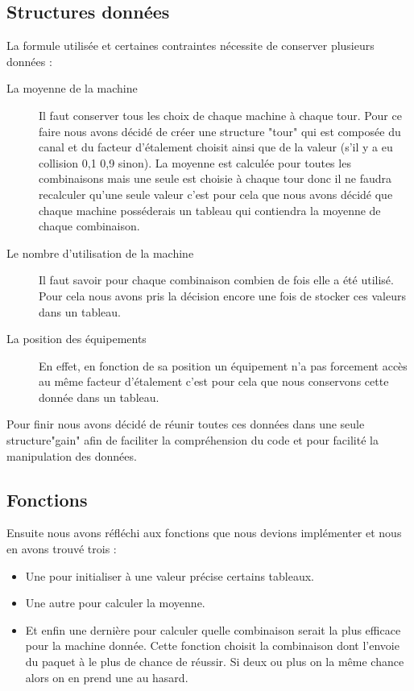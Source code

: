 \documentclass[12pt,a4paper]{article}
\begin{document}
\subsection{Structures données}
\label{sub.exp.struct}
La formule utilisée et certaines contraintes nécessite de conserver plusieurs données :
\begin{description}
    \item[La moyenne de la machine] Il faut conserver tous les 
    choix de chaque machine à chaque tour. Pour ce faire nous avons décidé
    de créer une structure "tour" qui est composée du canal et du facteur 
    d'étalement choisit ainsi que de la valeur (s'il y a eu collision 0,1
    0,9 sinon).
    La moyenne est calculée pour toutes les combinaisons mais une seule est 
    choisie à chaque tour donc il ne faudra recalculer qu'une seule valeur
    c'est pour cela que nous avons décidé que chaque machine posséderais 
    un tableau qui contiendra la moyenne de chaque combinaison.
    \item[Le nombre d'utilisation de la machine] Il faut savoir pour chaque 
    combinaison combien de fois elle a été utilisé. Pour cela nous avons 
    pris la décision encore une fois de stocker ces valeurs dans un tableau.
    \item[La position des équipements] En effet, en fonction de sa position 
    un équipement n'a pas forcement accès au même facteur d'étalement c'est 
    pour cela que nous conservons cette donnée dans un tableau.
\end{description}
Pour finir nous avons décidé de réunir toutes ces données dans une seule 
structure"gain" afin de faciliter la compréhension du code et pour facilité 
la manipulation des données.

\subsection{Fonctions}
\label{sub.exp.fct}
Ensuite nous avons réfléchi aux fonctions que nous devions implémenter et 
nous en avons trouvé trois : 
\begin{itemize}
	\item Une pour initialiser à une valeur précise certains tableaux.
	\item Une autre pour calculer la moyenne.
	\item Et enfin une dernière pour calculer quelle combinaison serait la
	plus efficace pour la machine donnée. Cette fonction choisit la combinaison
	dont l'envoie du paquet à le plus de chance de réussir. Si deux ou 
	plus on la même chance alors on en prend une au hasard.
\end{itemize}
\end{document}
